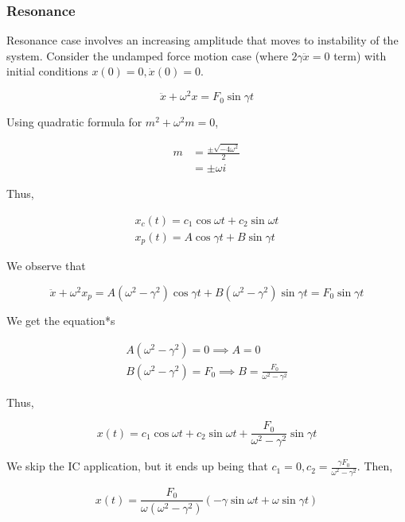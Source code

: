 \subsubsection{Resonance}

Resonance case involves an increasing amplitude that moves to instability of the system.
Consider the undamped force motion case (where $2\gamma\ddot x =0$ term) with initial conditions $x(0)=0,\dot x(0) = 0$.

\begin{equation*}
    \ddot x + \omega^2 x=F_0\sin\gamma t
\end{equation*}

Using quadratic formula for $m^2+\omega^2 m=0$,

\begin{align*}
    m&=\frac{\pm \sqrt{-4\omega^2}}{2}\\
    &=\pm \omega i
\end{align*}

Thus,

\begin{eqnarray}
    x_c(t)=c_1\cos\omega t+c_2\sin\omega t\\
    x_p(t)=A\cos\gamma t+B\sin \gamma t
\end{eqnarray}

We observe that

\begin{equation*}
    \ddot x+\omega^2x_p=A(\omega^2-\gamma^2)\cos\gamma t+B(\omega^2-\gamma^2)\sin\gamma t=F_0\sin\gamma t
\end{equation*}

We get the equation*s

\begin{eqnarray}
    A(\omega^2-\gamma^2)=0\implies A=0\\
    B(\omega^2-\gamma^2)=F_0\implies B=\frac{F_0}{\omega^2-\gamma^2}
\end{eqnarray}

Thus,

\begin{equation*}
    x(t)=c_1\cos\omega t+c_2\sin\omega t+\frac{F_0}{\omega^2-\gamma^2}\sin\gamma t
\end{equation*}

We skip the IC application, but it ends up being that $c_1=0,c_2=\frac{\gamma F_0}{\omega^2-\gamma^2}$.
Then,

\begin{equation*}
    x(t)=\frac{F_0}{\omega(\omega^2-\gamma^2)}\left(-\gamma \sin\omega t+\omega \sin\gamma t\right)
\end{equation*}


